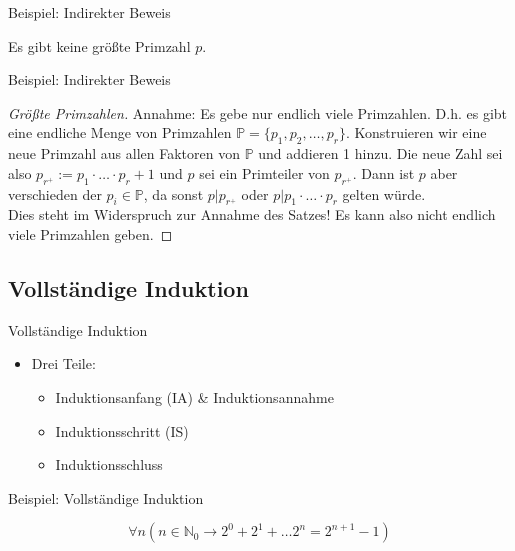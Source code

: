 \documentclass[12pt%
,aspectratio=169%
]{beamer}
\begin{document}
\begin{frame}{Beispiel: Indirekter Beweis}
\begin{theorem}
Es gibt keine größte Primzahl $p$.
\end{theorem}
\end{frame}

\begin{frame}{Beispiel: Indirekter Beweis}
\begin{proof}[Größte Primzahlen]
Annahme: Es gebe nur endlich viele Primzahlen. D.h. es gibt eine endliche Menge von Primzahlen $\mathbb{P} = \{p_1, p_2, \ldots, p_r\}$. Konstruieren wir eine neue Primzahl aus allen Faktoren von $\mathbb{P}$ und addieren 1 hinzu. Die neue Zahl sei also $p_{r^+} := p_1 \cdot \ldots \cdot p_r + 1$ und $p$ sei ein Primteiler von  $p_{r^+}$. Dann ist $p$ aber verschieden der $p_i \in \mathbb{P}$, da sonst $p | p_{r^+}$ oder $p | p_1 \cdot \ldots \cdot p_r$ gelten würde.\\
Dies steht im Widerspruch zur Annahme des Satzes! Es kann also nicht endlich viele Primzahlen geben.
\end{proof}
\end{frame}

\subsection{Vollständige Induktion}
\begin{frame}{Vollständige Induktion}
\begin{itemize}
	\item Drei Teile: 
	\begin{itemize}
		\item Induktionsanfang (IA) \& Induktionsannahme
		\item Induktionsschritt (IS)
		\item Induktionsschluss
	\end{itemize}
\end{itemize}
\end{frame}

\begin{frame}{Beispiel: Vollständige Induktion}
\begin{theorem}
$$\forall n (n \in \mathbb{N}_0 \rightarrow 2^0 + 2^1 + \dots 2^n = 2^{n+1}-1)$$
\end{theorem}
\end{frame}
\end{document}
